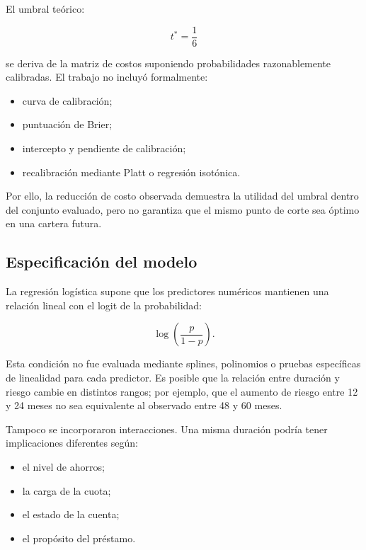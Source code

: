 El umbral teórico:

\[
t^{*}
=
\frac{1}{6}
\]

se deriva de la matriz de costos suponiendo probabilidades razonablemente
calibradas. El trabajo no incluyó formalmente:

\begin{itemize}
    \item curva de calibración;

    \item puntuación de Brier;

    \item intercepto y pendiente de calibración;

    \item recalibración mediante Platt o regresión isotónica.
\end{itemize}

Por ello, la reducción de costo observada demuestra la utilidad del
umbral dentro del conjunto evaluado, pero no garantiza que el mismo punto
de corte sea óptimo en una cartera futura.

\subsection{Especificación del modelo}

La regresión logística supone que los predictores numéricos mantienen una
relación lineal con el logit de la probabilidad:

\[
\log
\left(
    \frac{p}{1-p}
\right).
\]

Esta condición no fue evaluada mediante splines, polinomios o pruebas
específicas de linealidad para cada predictor. Es posible que la relación
entre duración y riesgo cambie en distintos rangos; por ejemplo, que el
aumento de riesgo entre 12 y 24 meses no sea equivalente al observado
entre 48 y 60 meses.

Tampoco se incorporaron interacciones. Una misma duración podría tener
implicaciones diferentes según:

\begin{itemize}
    \item el nivel de ahorros;

    \item la carga de la cuota;

    \item el estado de la cuenta;

    \item el propósito del préstamo.
\end{itemize}

